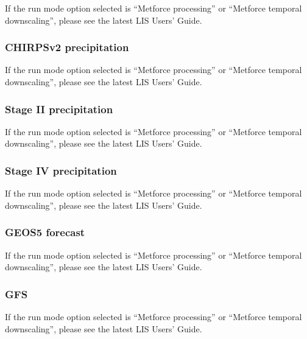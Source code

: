  If the run mode option selected is ``Metforce processing'' or
 ``Metforce temporal downscaling'', please see the latest LIS Users'
 Guide.

 

 
 \subsubsection{CHIRPSv2 precipitation} 

 If the run mode option selected is ``Metforce processing'' or
 ``Metforce temporal downscaling'', please see the latest LIS Users'
 Guide.

 

 
 \subsubsection{Stage II precipitation}

 If the run mode option selected is ``Metforce processing'' or
 ``Metforce temporal downscaling'', please see the latest LIS Users'
 Guide.

 

 
 \subsubsection{Stage IV precipitation} 

 If the run mode option selected is ``Metforce processing'' or
 ``Metforce temporal downscaling'', please see the latest LIS Users'
 Guide.

 


 
 \subsubsection{GEOS5 forecast} 

 If the run mode option selected is ``Metforce processing'' or
 ``Metforce temporal downscaling'', please see the latest LIS Users'
 Guide.

 

 
 \subsubsection{GFS} 

 If the run mode option selected is ``Metforce processing'' or
 ``Metforce temporal downscaling'', please see the latest LIS Users'
 Guide.

 


